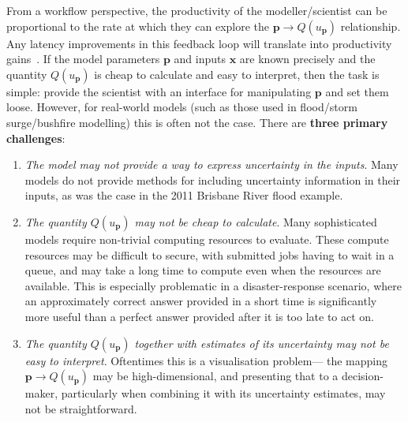 \documentclass[a4paper,fontsize=13pt]{scrartcl}
\begin{document}
From a workflow perspective, the productivity of the modeller/scientist can be 
proportional to the rate at which they can explore the
$\mathbf{p} \rightarrow Q(u_{\mathbf{p}})$ relationship. Any latency
improvements in this feedback loop will translate into productivity
gains~\parencite{liu_effects_2014}.
If the model parameters $\mathbf{p}$ and inputs $\mathbf{x}$ are known
precisely and the quantity $Q(u_{\mathbf{p}})$ is cheap to calculate
and easy to interpret, then the task is simple: provide the scientist
with an interface for manipulating $\mathbf{p}$ and set them loose.
However, for real-world models (such as those used in flood/storm
surge/bushfire modelling) this is often not the case. There are \textbf{three
primary challenges}:
\begin{enumerate}
\item \emph{The model may not provide a way to express uncertainty in
    the inputs}. Many models do not provide methods for including
  uncertainty information in their inputs, as was the case in the 2011
  Brisbane River flood example.
\item \emph{The quantity $Q(u_{\mathbf{p}})$ may not be cheap to
    calculate}. Many
  sophisticated models require non-trivial computing resources to evaluate. These compute resources may be
  difficult to secure, with submitted jobs having to wait in a queue, and may
  take a long time to compute even when the resources are available.
  This is especially problematic in a disaster-response scenario,
  where an approximately correct answer provided in a short time is
  significantly more useful than a perfect answer provided after it is
  too late to act on.
\item \emph{The quantity $Q(u_{\mathbf{p}})$ together with estimates of its uncertainty may not be easy to
    interpret}. Oftentimes this is a visualisation problem---
  the mapping $\mathbf{p} \rightarrow Q(u_{\mathbf{p}})$ may be high-dimensional,
  and presenting that to a decision-maker, particularly when combining it with its uncertainty estimates, may not be straightforward.
\end{enumerate}
\end{document}
